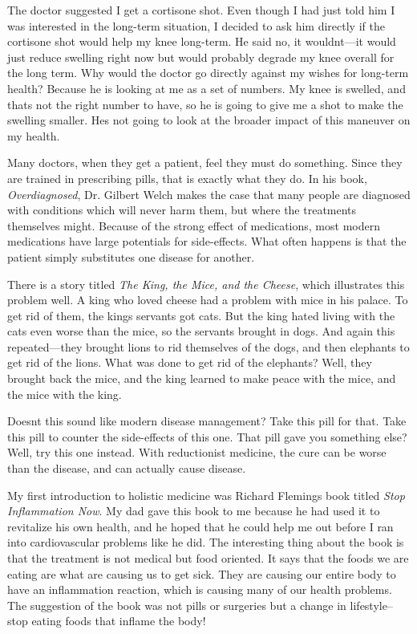 The doctor suggested I get a cortisone shot. Even though I had just told
him I was interested in the long-term situation, I decided to ask him
directly if the cortisone shot would help my knee long-term. He said
no, it wouldn{\textquotesingle}t—it would just reduce swelling right
now but would probably degrade my knee overall for the long term. Why
would the doctor go directly against my wishes for long-term health? 
Because he is looking at me as a set of numbers. My knee is swelled,
and that{\textquotesingle}s not the right number to have, so he is
going to give me a shot to make the swelling smaller.
He{\textquotesingle}s not going to look at the broader impact of this
maneuver on my health.

Many doctors, when they get a patient, feel they must do something.
Since they are trained in prescribing pills, that is exactly what they
do.  In his book, \textit{Overdiagnosed}, Dr. Gilbert Welch makes the
case that many people are diagnosed with conditions which will never
harm them, but where the treatments themselves might.  Because of the
strong effect of medications, most modern medications have large
potentials for side-effects. What often happens is that the patient
simply substitutes one disease for another. 

There is a story titled \textit{The King, the Mice, and the Cheese},
which illustrates this problem well. A king who loved cheese had a
problem with mice in his palace. To get rid of them, the
king{\textquotesingle}s servants got cats. But the king hated living
with the cats even worse than the mice, so the servants brought in
dogs. And again this repeated—they brought lions to rid themselves of
the dogs, and then elephants to get rid of the lions. What was done to
get rid of the elephants?  Well, they brought back the mice, and the
king learned to make peace with the mice, and the mice with the king.

Doesn{\textquotesingle}t this sound like modern disease management? 
Take this pill for that. Take this pill to counter the side-effects of
this one. That pill gave you something else?  Well, try this one
instead. With reductionist medicine, the cure can be worse than the
disease, and can actually cause disease.

My first introduction to holistic medicine was Richard
Fleming{\textquotesingle}s book titled \textit{Stop Inflammation Now}.
My dad gave this book to me because he had used it to revitalize his
own health, and he hoped that he could help me out before I ran into
cardiovascular problems like he did. The interesting thing about the
book is that the treatment is not medical but food oriented. It says
that the foods we are eating are what are causing us to get sick. They
are causing our entire body to have an inflammation reaction, which is
causing many of our health problems. The suggestion of the book was not
pills or surgeries but a change in lifestyle–stop eating foods that
inflame the body!

